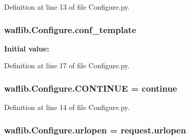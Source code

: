 Definition at line 13 of file Configure.\+py.

\subsubsection[{\texorpdfstring{conf\+\_\+template}{conf_template}}]{ waflib.\+Configure.\+conf\+\_\+template}\hypertarget{namespacewaflib_1_1_configure_a755bb085ce7925295880afd224816627}{}\label{namespacewaflib_1_1_configure_a755bb085ce7925295880afd224816627}
{\bfseries Initial value\+:}


Definition at line 17 of file Configure.\+py.

\subsubsection[{\texorpdfstring{C\+O\+N\+T\+I\+N\+UE}{CONTINUE}}]{ waflib.\+Configure.\+C\+O\+N\+T\+I\+N\+UE = \textquotesingle{}continue\textquotesingle{}}\hypertarget{namespacewaflib_1_1_configure_acfd31c8d79e0be3637bf031e9cb63e80}{}\label{namespacewaflib_1_1_configure_acfd31c8d79e0be3637bf031e9cb63e80}


Definition at line 14 of file Configure.\+py.

\subsubsection[{\texorpdfstring{urlopen}{urlopen}}]{\setlength{\rightskip}{0pt plus 5cm}waflib.\+Configure.\+urlopen = request.\+urlopen}\hypertarget{namespacewaflib_1_1_configure_a7ad4b2211ff3e33d326bc2da84055041}{}\label{namespacewaflib_1_1_configure_a7ad4b2211ff3e33d326bc2da84055041}


